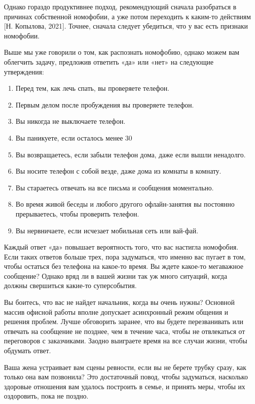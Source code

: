 Однако гораздо продуктивнее подход, рекомендующий сначала разобраться в причинах собственной номофобии, а уже потом переходить к каким-то действиям [Н. Копылова, 2021]. Точнее, сначала следует убедиться, что у вас есть признаки номофобии.

Выше мы уже говорили о том, как распознать номофобию, однако можем вам облегчить задачу, предложив ответить «да» или «нет» на следующие утверждения:
\begin{enumerate}
    \item Перед тем, как лечь спать, вы проверяете телефон.
    \item Первым делом после пробуждения вы проверяете телефон.
    \item Вы никогда не выключаете телефон.
    \item Вы паникуете, если осталось менее 30%
    \item Вы возвращаетесь, если забыли телефон дома, даже если вышли ненадолго.
    \item Вы носите телефон с собой везде, даже дома из комнаты в комнату.
    \item Вы стараетесь отвечать на все письма и сообщения моментально.
    \item Во время живой беседы и любого другого офлайн-занятия вы постоянно прерываетесь, чтобы проверить телефон.
    \item Вы нервничаете, если исчезает мобильная сеть или вай-фай.
\end{enumerate}

Каждый ответ «да» повышает вероятность того, что вас настигла номофобия. Если таких ответов больше трех, пора задуматься, что именно вас пугает в том, чтобы остаться без телефона на какое-то время. Вы ждете какое-то мегаважное сообщение? Однако вряд ли в вашей жизни так уж много ситуаций, когда должны свершиться какие-то суперсобытия.

Вы боитесь, что вас не найдет начальник, когда вы очень нужны? Основной массив офисной работы вполне допускает асинхронный режим общения и решения проблем. Лучше обговорить заранее, что вы будете перезванивать или отвечать на сообщение не позднее, чем в течение часа, чтобы не отвлекаться от переговоров с заказчиками. Заодно выиграете время на все случаи жизни, чтобы обдумать ответ.

Ваша жена устраивает вам сцены ревности, если вы не берете трубку сразу, как только она вам позвонила? Это достаточный повод, чтобы задуматься, насколько здоровые отношения вам удалось построить в семье, и принять меры, чтобы их оздоровить, пока не поздно.

